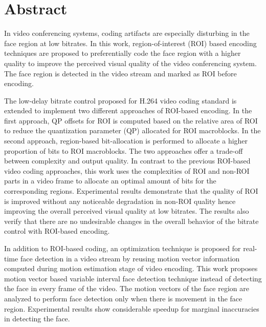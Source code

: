 
\thispagestyle{plain}

\section*{Abstract}
In video conferencing systems, coding artifacts are especially disturbing in the face region at low bitrates. In this work, region-of-interest (\ac{ROI}) based encoding techniques are proposed to preferentially code the face region with a higher quality to improve the perceived visual quality of the video conferencing system. The face region is detected in the video stream and marked as ROI before encoding. 

The low-delay bitrate control proposed for H.264 video coding standard is extended to implement two different approaches of ROI-based encoding. In the first approach, QP offsets for ROI is computed based on the relative area of ROI to reduce the quantization parameter (\ac{QP}) allocated for ROI macroblocks. In the second approach, region-based bit-allocation is performed to allocate a higher proportion of bits to ROI macroblocks. The two approaches offer a trade-off between complexity and output quality. In contrast to the previous ROI-based video coding approaches, this work uses the complexities of ROI and non-ROI parts in a video frame to allocate an optimal amount of bits for the corresponding regions. Experimental results demonstrate that the quality of ROI is improved without any noticeable degradation in non-ROI quality hence improving the overall perceived visual quality at low bitrates. The results also verify that there are no undesirable changes in the overall behavior of the bitrate control with ROI-based encoding.

In addition to ROI-based coding, an optimization technique is proposed for real-time face detection in a video stream by reusing motion vector information computed during motion estimation stage of video encoding. This work proposes motion vector based variable interval face detection technique instead of detecting the face in every frame of the video. The motion vectors of the face region are analyzed to perform face detection only when there is movement in the face region. Experimental results show considerable speedup for marginal inaccuracies in detecting the face. 

